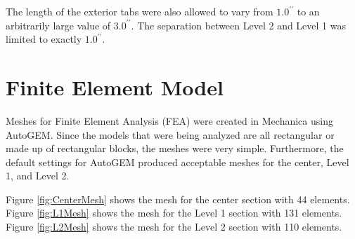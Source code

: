 \documentclass[12pt,letterpaper]{report}
\newcommand{\inchsign}{^{\prime\prime}} %
\begin{document}
		The length of the exterior tabs were also allowed to vary from $1.0\inchsign$ to an arbitrarily large value of $3.0\inchsign$.  The separation between Level 2 and Level 1 was limited to exactly $1.0\inchsign$.
		
		\section{Finite Element Model}
		Meshes for Finite Element Analysis (FEA) were created in Mechanica using AutoGEM.  Since the models that were being analyzed are all rectangular or made up of rectangular blocks, the meshes were very simple.  Furthermore, the default settings for AutoGEM produced acceptable meshes for the center, Level 1, and Level 2.
		
		Figure \ref{fig:CenterMesh} shows the mesh for the center section with 44 elements.  Figure \ref{fig:L1Mesh} shows the mesh for the Level 1 section with 131 elements.  Figure \ref{fig:L2Mesh} shows the mesh for the Level 2 section with 110 elements.
		
\end{document}
